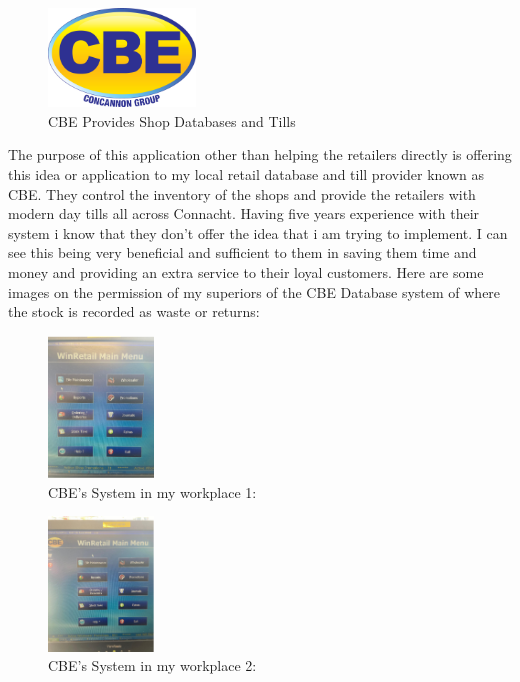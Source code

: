 \begin{figure}[h!]
	\caption{CBE Provides Shop Databases and Tills}
	\label{image:cbe}
	\centering
	\includegraphics[width=0.35\textwidth]{images/cbe.jpg}
\end{figure}

The purpose of this application other than helping the retailers directly is offering this idea or application to my local retail database and till provider known as CBE. They control the inventory of the shops and provide the retailers with modern day tills all across Connacht. Having five years experience with their system i know that they don't offer the idea that i am trying to implement. I can see this being very beneficial and sufficient to them in saving them time and money and providing an extra service to their loyal customers. \newline
Here are some images on the permission of my superiors of the CBE Database system of where the stock is recorded as waste or returns:

\begin{figure}[h!]
	\caption{CBE's System in my workplace 1:}
	\label{image:mace1}
	\centering
	\includegraphics[width=0.25\textwidth]{images/mace1.PNG}
\end{figure}

\begin{figure}[h!]
	\caption{CBE's System in my workplace 2:}
	\label{image:mace2}
	\centering
	\includegraphics[width=0.25\textwidth]{images/mace2.PNG}
\end{figure}

